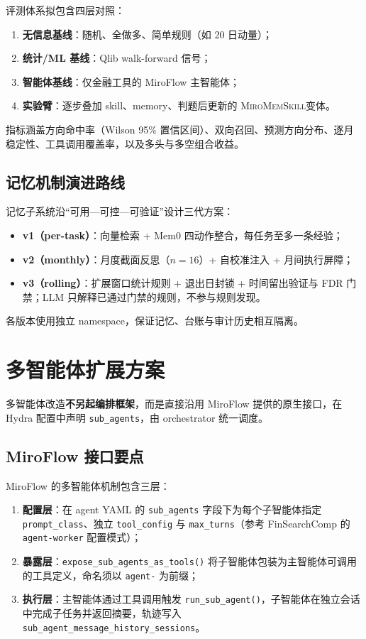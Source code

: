 \documentclass[11pt]{article}
\newcommand{\system}{\textsc{MiroMemSkill}}
\begin{document}
评测体系拟包含四层对照：
\begin{enumerate}
    \item \textbf{无信息基线}：随机、全做多、简单规则（如 20 日动量）；
    \item \textbf{统计/ML 基线}：Qlib walk-forward 信号；
    \item \textbf{智能体基线}：仅金融工具的 MiroFlow 主智能体；
    \item \textbf{实验臂}：逐步叠加 skill、memory、判题后更新的 \system 变体。
\end{enumerate}
指标涵盖方向命中率（Wilson 95\% 置信区间）、双向召回、预测方向分布、逐月稳定性、工具调用覆盖率，以及多头与多空组合收益。

\subsection{记忆机制演进路线}

记忆子系统沿“可用---可控---可验证”设计三代方案：
\begin{itemize}
    \item \textbf{v1（per-task）}：向量检索 + Mem0 四动作整合，每任务至多一条经验；
    \item \textbf{v2（monthly）}：月度截面反思（$n=16$）+ 自校准注入 + 月间执行屏障；
    \item \textbf{v3（rolling）}：扩展窗口统计规则 + 退出日封锁 + 时间留出验证与 FDR 门禁；LLM 只解释已通过门禁的规则，不参与规则发现。
\end{itemize}
各版本使用独立 namespace，保证记忆、台账与审计历史相互隔离。

\section{多智能体扩展方案}

多智能体改造\textbf{不另起编排框架}，而是直接沿用 MiroFlow 提供的原生接口，在 Hydra 配置中声明 \texttt{sub\_agents}，由 orchestrator 统一调度。

\subsection{MiroFlow 接口要点}

MiroFlow 的多智能体机制包含三层：
\begin{enumerate}
    \item \textbf{配置层}：在 agent YAML 的 \texttt{sub\_agents} 字段下为每个子智能体指定 \texttt{prompt\_class}、独立 \texttt{tool\_config} 与 \texttt{max\_turns}（参考 FinSearchComp 的 \texttt{agent-worker} 配置模式）；
    \item \textbf{暴露层}：\texttt{expose\_sub\_agents\_as\_tools()} 将子智能体包装为主智能体可调用的工具定义，命名须以 \texttt{agent-} 为前缀；
    \item \textbf{执行层}：主智能体通过工具调用触发 \texttt{run\_sub\_agent()}，子智能体在独立会话中完成子任务并返回摘要，轨迹写入 \texttt{sub\_agent\_message\_history\_sessions}。
\end{enumerate}
\end{document}
